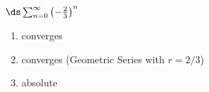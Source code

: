 {$\ds \sum_{n=0}^\infty \left(-\frac23\right)^n$
}
{\begin{enumerate}
	\item converges
	\item	converges (Geometric Series with $r=2/3$)
	\item absolute
\end{enumerate}
}
